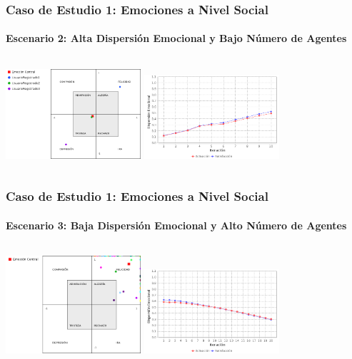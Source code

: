 \documentclass{beamer}
\begin{document}
\begin{frame}
\frametitle{Caso de Estudio 1: Emociones a Nivel Social}
\framesubtitle{Escenario 2: Alta Dispersión Emocional y Bajo Número de Agentes}
\begin{columns}
\tiny
\centering
\includegraphics[width=5cm]{ilustraciones/caso1escenario2-emocioncentral}
\tiny
\centering
\includegraphics[width=5cm]{ilustraciones/caso1escenario2-dispersionemocional}
\end{columns}
\end{frame}

\begin{frame}
\frametitle{Caso de Estudio 1: Emociones a Nivel Social}
\framesubtitle{Escenario 3: Baja Dispersión Emocional y Alto Número de Agentes}
\begin{columns}
\tiny
\centering
\includegraphics[width=5cm]{ilustraciones/caso1escenario3-emocioncentral-final}
\tiny
\centering
\includegraphics[width=5cm]{ilustraciones/caso1escenario3-dispersionemocional}
\end{columns}
\end{frame}
\end{document}
